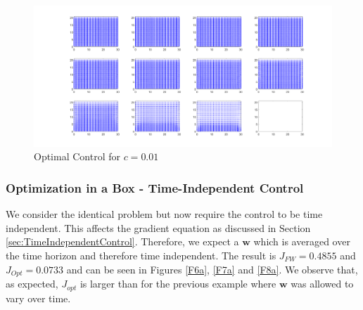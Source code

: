 \documentclass[11pt, a4paper]{article}
\theoremstyle{definition}
\newcommand{\w}{\mathbf{w}}
\begin{document}
\begin{figure}[h]
	\centering
	\includegraphics[scale=0.35]{F31.png}
	\caption{Optimal Control for $c = 0.01$} 
	\label{Fa3}
\end{figure}



\subsubsection{Optimization in a Box - Time-Independent Control}
We consider the identical problem but now require the control to be time independent. This affects the gradient equation as discussed in Section \ref{sec:TimeIndependentControl}.
Therefore, we expect a $\w$ which is averaged over the time horizon and therefore time independent. The result is $J_{FW} = 0.4855$ and $J_{Opt} = 0.0733$ and can be seen in Figures \ref{F6a}, \ref{F7a} and \ref{F8a}. We observe that, as expected, $J_{opt}$ is larger than for the previous example where $\w$ was allowed to vary over time.
\end{document}
